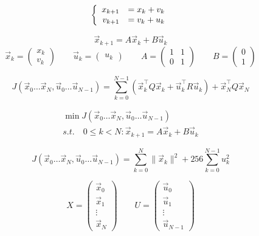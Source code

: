 \documentclass{article}
\begin{document}
\thispagestyle{empty}

\iffalse
$$
\left \{ \begin{array}{r l}
x_{k+1} & = x_k + v_k\\
v_{k+1} & = v_k + u_k
\end{array} \right.
$$


$$
\vec{x}_{k+1} = A \vec{x}_k + B \vec{u}_k
$$
$$
\vec{x}_k=\begin{pmatrix}x_k\\v_k\end{pmatrix}\qquad \vec{u}_k=\begin{pmatrix}u_k\end{pmatrix}\qquad A=\begin{pmatrix} 1 & 1 \\ 0 & 1\end{pmatrix} \qquad B=\begin{pmatrix}0\\1\end{pmatrix}
$$

$$
J(\vec{x}_0\dots\vec{x}_N,\vec{u}_0\dots\vec{u}_{N-1}) = \sum\limits_{k=0}^{N-1}\left( \vec{x}_k^\top Q\vec{x}_k + \vec{u}_k^\top R\vec{u}_k\right) + \vec{x}_N^\top Q \vec{x}_N
$$

$$
\begin{array}{l}
\min J(\vec{x}_0\dots\vec{x}_N,\vec{u}_0\dots\vec{u}_{N-1})\\
s.t.\quad 0\leq k < N : \vec{x}_{k+1} = A \vec{x}_k + B \vec{u}_k
\end{array}
$$

$$
J(\vec{x}_0\dots\vec{x}_N,\vec{u}_0\dots\vec{u}_{N-1}) = \sum\limits_{k=0}^{N} \|\vec{x}_k\|^2 + 256 \sum\limits_{k=0}^{N-1} u_k^2
$$


$$
X=\begin{pmatrix}\vec{x}_0\\ \vec{x}_1 \\ \vdots \\ \vec{x}_N\end{pmatrix} 
\qquad
U=\begin{pmatrix}\vec{u}_0\\ \vec{u}_1 \\ \vdots \\ \vec{u}_{N-1}\end{pmatrix} 
$$
\end{document}
